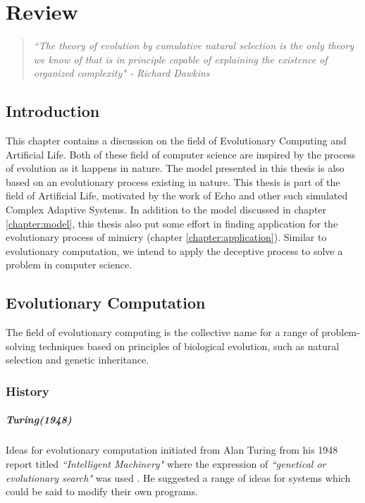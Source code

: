 \chapter{Review}
\label{chapter:review}
\begin{quote}
\textsl{``The theory of evolution by cumulative natural selection is the only theory we know of that is in principle capable of explaining the existence of organized complexity" - Richard Dawkins \cite{dawkins1996}}
\end{quote}

\section{Introduction}
This chapter contains a discussion on the field of Evolutionary Computing and Artificial Life. Both of these field of computer science are inspired by the process of evolution as it happens in nature. The model presented in this thesis is also based on an evolutionary process existing in nature. This thesis is part of the field of Artificial Life, motivated by the work of Echo and other such simulated Complex Adaptive Systems. In addition to the model discussed in chapter \ref{chapter:model}, this thesis also put some effort in finding application for the evolutionary process of mimicry (chapter \ref{chapter:application}). Similar to evolutionary computation, we intend to apply the deceptive process to solve a problem in computer science.

\section{Evolutionary Computation}
The field of evolutionary computing is the collective name for a range of problem-solving techniques based on principles of biological evolution, such as natural selection and genetic inheritance. 

\subsection{History}
\label{subsec:evo-comp-history}

\paragraph{Turing(1948)}
Ideas for evolutionary computation initiated from Alan Turing from his 1948 report titled \textsl{``Intelligent Machinery"} where the expression of \textsl{``genetical or evolutionary search"}  was used \cite{turing1948}. He suggested a range of ideas for systems which could be said to modify their own programs. 

